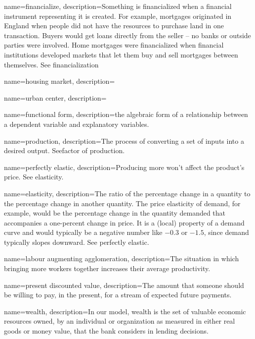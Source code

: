 {
name=financialize,
description={Something is financialized when a financial instrument representing it is created. For example, mortgages originated in England when people did not have the resources to purchase land in one transaction. Buyers would get loans directly from the seller – no banks or outside parties were involved. Home mortgages were financialized when financial institutions developed markets that let them buy and sell mortgages between themselves.  See \gls{financialization}}
}

{
name=housing market,
description={}
}

{
name=urban center,
description={}
}

{
name=functional form,
description={the algebraic form of a relationship between a dependent variable and explanatory variables.}
}

{
name=production,
description={The process of converting a set of \glspl{input} into a desired \gls{output}. See\gls{factor of production}.}
}

{
name=perfectly elastic,
description={Producing more won't affect the product's price. See \gls{elasticity}.} %
}

{
name=elasticity,
description={The ratio of the percentage change in a quantity to the percentage change in another quantity. The price elasticity of demand, for  example, would be the percentage change in the quantity demanded that accompanies a one-percent change in price. It is a (local) property of a demand curve and would typically be a negative number like $-0.3$ or $-1.5$, since demand typically slopes downward. See \gls{perfectly elastic}.}
}

{
name=labour augmenting agglomeration,
description={The situation in which bringing more workers together increases their average productivity.}
}

{
name=present discounted value,
description={The amount that someone should be willing to pay, in the present, for a stream of expected future payments.}
}

{
name=wealth,
description={In our model, wealth is the set of valuable economic resources owned, by an individual or organization as measured in either real goods or money value, that the bank considers in lending decisions.}
}

